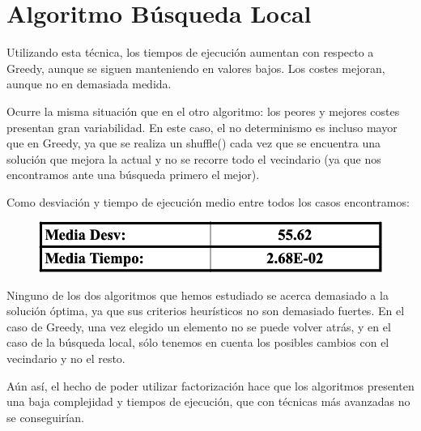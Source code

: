 \newpage

\section{Algoritmo Búsqueda Local}
Utilizando esta técnica, los tiempos de ejecución aumentan con respecto a Greedy, aunque se siguen manteniendo en valores bajos. Los costes mejoran, aunque no en demasiada medida.

Ocurre la misma situación que en el otro algoritmo: los peores y mejores costes presentan gran variabilidad. En este caso, el no determinismo es incluso mayor que en Greedy, ya que se realiza un shuffle() cada vez que se encuentra una solución que mejora la actual y no se recorre todo el vecindario (ya que nos encontramos ante una búsqueda primero el mejor). 

Como desviación y tiempo de ejecución medio entre todos los casos encontramos:
\begin{figure}[H] %
    \centering
        \includegraphics[scale=0.35]{img/bl2.png}
\end{figure}

Ninguno de los dos algoritmos que hemos estudiado se acerca demasiado a la solución óptima, ya que sus criterios heurísticos no son demasiado fuertes. En el caso de Greedy, una vez elegido un elemento no se puede volver atrás, y en el caso de la búsqueda local, sólo tenemos en cuenta los posibles cambios con el vecindario y no el resto.

Aún así, el hecho de poder utilizar factorización hace que los algoritmos presenten una baja complejidad y tiempos de ejecución, que con técnicas más avanzadas no se conseguirían.

